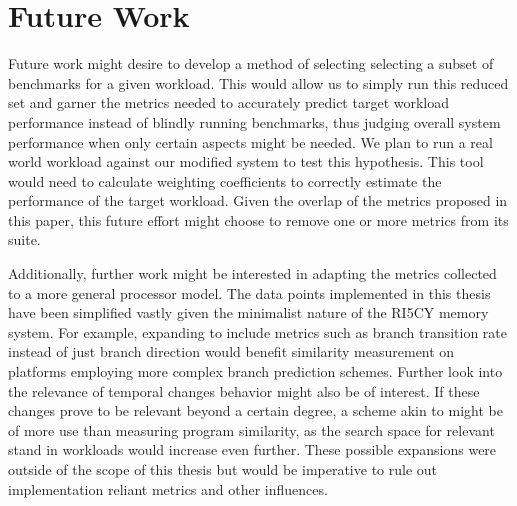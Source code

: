 \documentclass[../bachelor_paper.tex]{subfiles}
\begin{document}
\chapter{Future Work}
    \label{ch:future}
Future work might desire to develop a method of selecting selecting a subset of benchmarks for a given workload. This would allow us to simply run this reduced set and garner the metrics needed to accurately predict target workload performance instead of blindly running benchmarks, thus judging overall system performance when only certain aspects might be needed. We plan to run a real world workload against our modified system to test this hypothesis. This tool would need to calculate weighting coefficients to correctly estimate the performance of the target workload. Given the overlap of the metrics proposed in this paper, this future effort might choose to remove one or more metrics from its suite.

Additionally, further work might be interested in adapting the metrics collected to a more general processor model. The data points implemented in this thesis have been simplified vastly given the minimalist nature of the RI5CY memory system. For example, expanding to include metrics such as branch transition rate \cite{haungsBranchTransitionRate2000} instead of just branch direction would benefit similarity measurement on platforms employing more complex branch prediction schemes. Further look into the relevance of temporal changes behavior might also be of interest. If these changes prove to be relevant beyond a certain degree, a scheme akin to \cite{joshiDistillingEssenceProprietary2008} might be of more use than measuring program similarity, as the search space for relevant stand in workloads would increase even further. These possible expansions were outside of the scope of this thesis but would be imperative to rule out implementation reliant metrics and other influences.


\isstandalone



\fi
\end{document}
